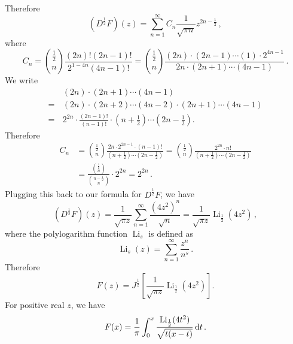 \documentclass[11pt]{book}
\DeclareMathOperator{\Li}{Li}
\begin{document}
Therefore
\begin{equation}
  (D^\frac{1}{2}F)(z) = \sum^\infty_{n=1} C_n \frac{1}{\sqrt{\pi n}} z^{2n-\frac{1}{2}}\,,
\end{equation}
where
\begin{equation}
  C_n = \binom{\frac{1}{2}}{n} \frac{(2n)!(2n-1)!}{2^{1-4n} (4n-1)!} =\binom{\frac{1}{2}}{n} \frac{(2n)\cdot(2n-1)\cdots(1)\cdot2^{4n-1}}{2n\cdot(2n+1)\cdots(4n-1)}\,.
\end{equation}
We write
\begin{equation}
  \begin{split}
    &(2n)\cdot(2n+1)\cdots(4n-1)\\
    =\,&(2n)\cdot(2n+2)\cdots(4n-2) \cdot (2n+1)\cdots(4n-1) \\
    =\,& 2^{2n}\cdot \frac{(2n-1)!}{(n-1)!}\cdot\left(n+\frac{1}{2}\right)\cdots\left(2n-\frac{1}{2}\right).
  \end{split}
\end{equation}
Therefore
\begin{equation}
  \begin{split}
    C_n &= \binom{\frac{1}{2}}{n}\frac{2n\cdot 2^{2n-1} \cdot(n-1)!}{\left(n+\frac{1}{2}\right)\cdots\left(2n-\frac{1}{2}\right)} = \binom{\frac{1}{2}}{n}\frac{2^{2n}\cdot n!}{\left(n+\frac{1}{2}\right)\cdots\left(2n-\frac{1}{2}\right)}\\
    &=\frac{\binom{\frac{1}{2}}{n}}{\binom{n-\frac{1}{2}}{n}}\cdot2^{2n} = 2^{2n}\,.
  \end{split}
\end{equation}
Plugging this back to our formula for $D^\frac{1}{2}F$, we have
\begin{equation}
  (D^\frac{1}{2}F)(z) = \frac{1}{\sqrt{\pi z}} \sum^\infty_{n=1} \frac{(4z^2)^n}{\sqrt{n}} = \frac{1}{\sqrt{\pi z}}\Li_{\frac{1}{2}}(4z^2)\,,
\end{equation}
where the polylogarithm function $\Li_s$ is defined as
\begin{equation}
  \Li_s(z) = \sum^\infty_{n=1}\frac{z^n}{n^s}\,.
\end{equation}
Therefore
\begin{equation}
  F(z) = J^\frac{1}{2}\left[\frac{1}{\sqrt{\pi z}}\Li_{\frac{1}{2}}(4z^2)\right].
\end{equation}
For positive real $z$, we have
\begin{equation}
  F(x) = \frac{1}{\pi}\int^x_0\frac{\Li_{\frac{1}{2}}(4t^2)}{\sqrt{t(x-t)}}\,{\rm d}t\,.
\end{equation}
\end{document}
